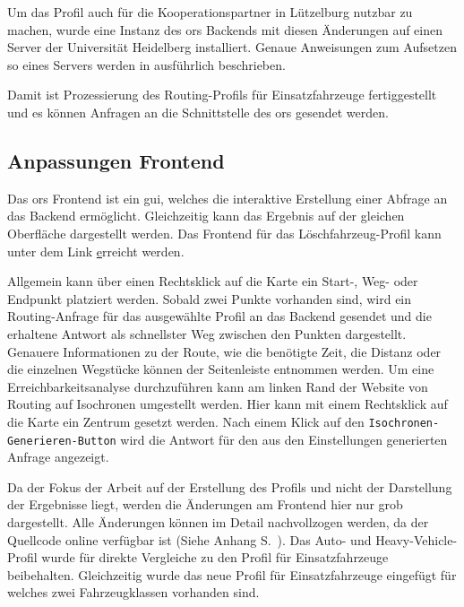 Um das Profil auch für die Kooperationspartner in Lützelburg nutzbar zu machen, wurde eine Instanz des \gls{ors} Backends mit diesen Änderungen auf einen Server der Universität Heidelberg installiert.
Genaue Anweisungen zum Aufsetzen so eines Servers werden in \cite{neisdoktor} ausführlich beschrieben.

Damit ist Prozessierung des Routing-Profils für Einsatzfahrzeuge fertiggestellt und es können Anfragen an die Schnittstelle des \gls{ors} gesendet werden.


\subsection{Anpassungen Frontend}

Das \gls{ors} Frontend ist ein \gls{gui}, welches die interaktive Erstellung einer Abfrage an das Backend ermöglicht.
Gleichzeitig kann das Ergebnis auf der gleichen Oberfläche dargestellt werden.
Das Frontend für das Löschfahrzeug-Profil kann unter dem Link \href{emergency.openrouteservice.org} erreicht werden.

\bigskip

Allgemein kann über einen Rechtsklick auf die Karte ein Start-, Weg- oder Endpunkt platziert werden.
Sobald zwei Punkte vorhanden sind, wird ein Routing-Anfrage für das ausgewählte Profil an das Backend gesendet und die erhaltene Antwort als schnellster Weg zwischen den Punkten dargestellt.
Genauere Informationen zu der Route, wie die benötigte Zeit, die Distanz oder die einzelnen Wegstücke können der Seitenleiste entnommen werden.
Um eine Erreichbarkeitsanalyse durchzuführen kann am linken Rand der Website von Routing auf Isochronen umgestellt werden.
Hier kann mit einem Rechtsklick auf die Karte ein Zentrum gesetzt werden.
Nach einem Klick auf den \texttt{Isochronen-Generieren-Button} wird die Antwort für den aus den Einstellungen generierten Anfrage angezeigt.

\bigskip

Da der Fokus der Arbeit auf der Erstellung des Profils und nicht der Darstellung der Ergebnisse liegt, werden die Änderungen am Frontend hier nur grob dargestellt.
Alle Änderungen können im Detail nachvollzogen werden, da der Quellcode online verfügbar ist (Siehe Anhang S.~\pageref{sec:anhang}). Das Auto- und Heavy-Vehicle-Profil wurde für direkte Vergleiche zu den Profil für Einsatzfahrzeuge beibehalten.
Gleichzeitig wurde das neue Profil für Einsatzfahrzeuge eingefügt für welches zwei Fahrzeugklassen vorhanden sind.

